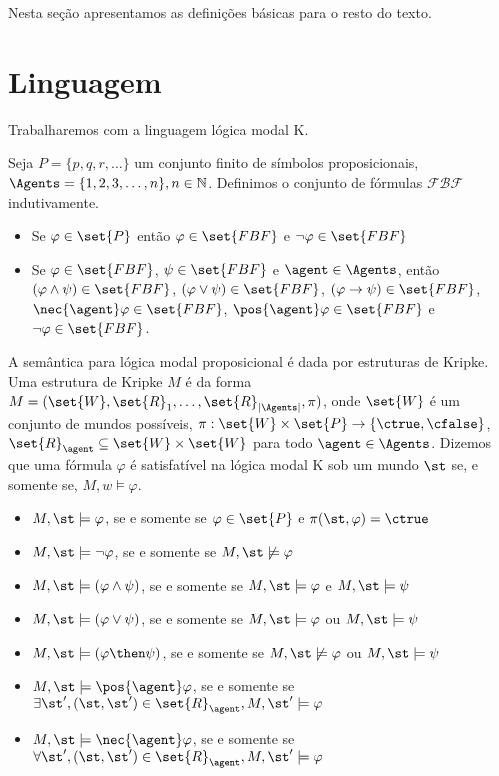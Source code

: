 	
Nesta seção apresentamos as definições básicas para o resto do texto.

\section{Linguagem}
Trabalharemos com a linguagem lógica modal K.

\begin{definition}
Seja $P = \{p, q, r, \dots\}$ um conjunto finito de símbolos proposicionais, $\Agents = \{1, 2, 3, \dots, n\}, n \in \mathbb{N}$. Definimos o conjunto de fórmulas $\mathcal{FBF}$ indutivamente.

\begin{itemize}
\item Se $\varphi \in \set{P}$ então $\varphi \in \set{FBF}$ e $\neg\varphi \in \set{FBF}$
\item Se $\varphi \in \set{FBF}$, $\psi \in \set{FBF}$ e $\agent \in \Agents$, então $(\varphi \land \psi) \in \set{FBF}$, $(\varphi \lor \psi) \in \set{FBF}$, $(\varphi \rightarrow \psi) \in \set{FBF}$, $\nec{\agent} \varphi \in \set{FBF}$, $\pos{\agent} \varphi \in \set{FBF}$ e $\neg\varphi \in \set{FBF}$.
\end{itemize}
\end{definition}


A semântica para lógica modal proposicional é dada por estruturas de Kripke. Uma estrutura de Kripke $M$ é da forma $M = (\set{W}, \set{R}_1, \ldots, \set{R}_{|\Agents|}, \pi)$, onde %
$\set{W}$ é um conjunto de mundos possíveis, $\pi:\set{W} \times \set{P} \rightarrow \{\ctrue, \cfalse\}$, $\set{R}_\agent \subseteq \set{W} \times \set{W}$ para todo $\agent \in \Agents$. Dizemos que uma fórmula $\varphi$ é satisfatível na lógica modal K sob um mundo $\st$ se, e somente se, $M,w \models \varphi$.

\begin{itemize}
\item $M,\st \models \varphi$, se e somente se $\varphi \in \set{P}$ e $\pi(\st, \varphi) = \ctrue$
\item $M,\st \models \neg\varphi$, se e somente se $M,\st \not\models \varphi$
\item $M,\st \models (\varphi \land \psi)$, se e somente se $M,\st \models \varphi$ e $M,\st \models \psi $
\item $M,\st \models (\varphi \lor \psi)$, se e somente se $M,\st \models \varphi$ ou $M,\st \models \psi $
\item $M,\st \models (\varphi \then \psi)$, se e somente se $M,\st \not\models \varphi$ ou $M,\st \models \psi $

\item $M,\st \models \pos{\agent}\varphi$, se e somente se $\exists\st', (\st, \st') \in \set{R}_\agent, M,\st' \models \varphi$
\item $M,\st \models \nec{\agent}\varphi$, se e somente se $\forall\st', (\st, \st') \in \set{R}_\agent, M,\st' \models \varphi$

\end{itemize}


